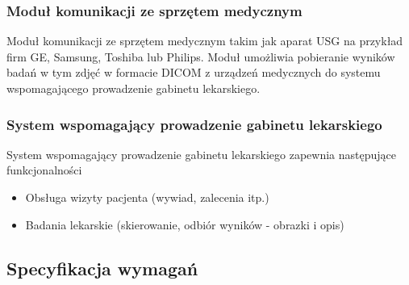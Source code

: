 \documentclass[polish,12pt]{aghthesis}
\begin{document}
\subsubsection{Moduł komunikacji ze sprzętem medycznym}
Moduł komunikacji ze sprzętem medycznym takim jak aparat USG na przykład firm GE, Samsung, Toshiba lub Philips. Moduł umożliwia pobieranie wyników badań w tym zdjęć w formacie DICOM z urządzeń medycznych do systemu wspomagającego prowadzenie gabinetu lekarskiego.
\subsubsection{System wspomagający prowadzenie gabinetu lekarskiego}
System wspomagający prowadzenie gabinetu lekarskiego zapewnia następujące funkcjonalności
\begin{itemize}
  \item Obsługa wizyty pacjenta (wywiad, zalecenia itp.)
  \item Badania lekarskie (skierowanie, odbiór wyników - obrazki i opis)
\end{itemize}

\subsection{Specyfikacja wymagań}
\end{document}
